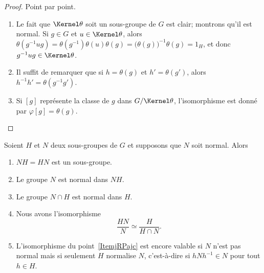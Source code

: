\begin{proof}
    Point par point.
    \begin{enumerate}
        \item
            Le fait que  \( \Kernel\theta\) soit un sous-groupe de \( G\) est clair; montrons qu'il est normal. Si \( g \in G \) et \( u \in \Kernel\theta\), alors \(\theta (g^{-1} u g) = \theta(g^{-1})\theta(u)\theta(g) = \bigl(\theta(g)\bigr)^{-1}\theta(g) = 1_H \), et donc \( g^{-1} u g \in \Kernel\theta\).
        \item
            Il suffit de remarquer que si \( h = \theta(g) \) et \( h' = \theta(g') \), alors \( h^{-1} h' = \theta(g^{-1} g') \).
        \item
            Si \( [g]\) représente la classe de \( g\) dans \( G/\Kernel\theta\), l'isomorphisme est donné par \( \varphi[g]=\theta(g)\).
    \end{enumerate}
\end{proof}

\begin{theorem}
    Soient \( H\) et \( N\) deux sous-groupes de \( G\) et supposons que \( N\) soit normal. Alors
    \begin{enumerate}
        \item
            \( NH=HN\) est un sous-groupe.
        \item
            Le groupe \( N\) est normal dans \( NH\).
        \item
            Le groupe \( N\cap H\) est normal dans \( H\).

        \item\label{ItemjRPajc}
            Nous avons l'isomorphisme
            \begin{equation}
                \frac{ HN }{ N }\simeq\frac{ H }{ H\cap N }.
            \end{equation}
        \item   \label{ItembgDQEN}
            L'isomorphisme du point~\ref{ItemjRPajc} est encore valable si \( N\) n'est pas normal mais si seulement \( H\) normalise \( N\), c'est-à-dire si \( hNh^{-1}\in N\) pour tout \( h\in H\).
    \end{enumerate}
\end{theorem}

